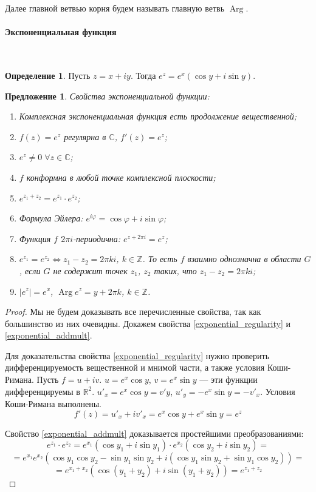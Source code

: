 \documentclass[11pt,openany,a4paper]{scrartcl}
\theoremstyle{plain}
\newtheorem{proposition}[theorem]{Предложение}
\theoremstyle{definition}
\newtheorem{definition}[theorem]{Определение}
\newcommand\mb{\mathbb}
\newcommand\real{\mb R}
\newcommand{\complex}{\mb C}
\newcommand\lparagraph[1]{\paragraph{#1}\mbox{}\\}
\DeclareMathOperator{\Arg}{Arg}
\begin{document}
Далее главной ветвью корня будем называть главную ветвь $\Arg$.

\lparagraph{Экспоненциальная функция}

\begin{definition}
	Пусть $z = x + iy$. Тогда $e^z = e^x(\cos y + i\sin y)$.
\end{definition}

\begin{proposition}
	Свойства экспоненциальной функции:
\begin{enumerate}
	\item Комплексная экспоненциальная функция есть продолжение вещественной;
	\item\label{exponential_regularity} $f(z) = e^z$ регулярна в $\complex$, $f'(z) = e^z$;
	\item $e^z \neq 0\; \forall z \in \complex$;
	\item $f$ конформна в любой точке комплексной плоскости;
	\item\label{exponential_addmult} $e^{z_1+z_2} = e^{z_1}\cdot e^{z_2}$;
	\item Формула Эйлера: $e^{i\varphi} = \cos \varphi + i\sin \varphi$;
	\item Функция $f$ $2\pi i$-периодична: $e^{z + 2\pi i} = e^z$;
	\item $e^{z_1} = e^{z_2} \iff z_1 - z_2 = 2\pi ki$, $k \in \mb Z$. То есть $f$ взаимно 
	однозначна в области $G$, если $G$ не содержит точек $z_1$, $z_2$ таких, что
	$z_1 - z_2 = 2\pi ki$;
	\item $|e^z| = e^x$, $\Arg e^z = y + 2\pi k$, $k \in \mb Z$.
\end{enumerate}
\end{proposition}
\begin{proof}
	Мы не будем доказывать все перечисленные свойства, так как большинство из них очевидны.
	Докажем свойства \ref{exponential_regularity} и \ref{exponential_addmult}.
	
	Для доказательства свойства \ref{exponential_regularity} нужно проверить дифференцируемость 
	вещественной и мнимой части, а также условия Коши-Римана.
	Пусть $f = u + iv$. $u = e^x\cos y$, $v = e^x\sin y$ — эти функции дифференцируемы в $\real^2$.
	$u'_x = e^x\cos y = v'y$, $u'_y = -e^x\sin y = -v'_x$. Условия Коши-Римана выполнены.
	$$
	f'(z) = u'_x + iv'_x = e^x \cos y + e^x\sin y = e^z
	$$
	
	Свойство \ref{exponential_addmult} доказывается простейшими преобразованиями:
	$$
	e^{z_1}\cdot e^{z_2} = e^{x_1}({\cos y_1 + i\sin y_1})\cdot e^{x_2}(\cos y_2 + i\sin y_2) =
	$$
	$$
	= e^{x_1}e^{x_2}(\cos y_1 \cos y_2 - \sin y_1 \sin y_2 + i(\cos y_1 \sin y_2 + \sin y_1 \cos y_2)) =
	$$
	$$
	= e^{x_1 + x_2}(\cos (y_1 + y_2) + i\sin (y_1 + y_2)) = e^{z_1 + z_2}
	$$
\end{proof}
\end{document}
